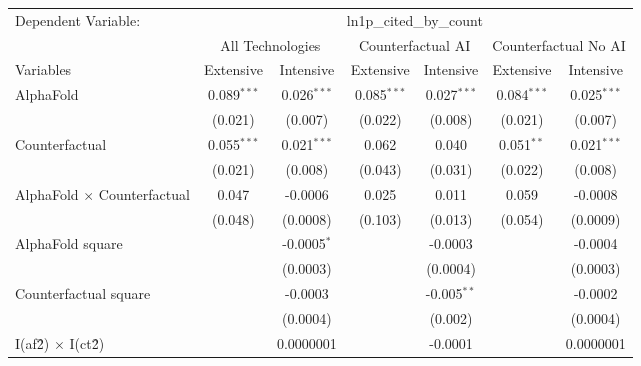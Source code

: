 \begingroup
\centering
\begin{tabular}{lcccccc}
   \tabularnewline \midrule \midrule
   Dependent Variable: & \multicolumn{6}{c}{ln1p\_cited\_by\_count}\\
 & \multicolumn{2}{c}{All Technologies} & \multicolumn{2}{c}{Counterfactual AI} & \multicolumn{2}{c}{Counterfactual No AI} \\
\cmidrule(lr){1-1}\cmidrule(lr){2-3} \cmidrule(lr){4-5} \cmidrule(lr){6-7}
Variables & \multicolumn{1}{c}{Extensive} & \multicolumn{1}{c}{Intensive} & \multicolumn{1}{c}{Extensive} & \multicolumn{1}{c}{Intensive} & \multicolumn{1}{c}{Extensive} & \multicolumn{1}{c}{Intensive} \\
\cmidrule(lr){1-1}\cmidrule(lr){2-2} \cmidrule(lr){3-3} \cmidrule(lr){4-4} \cmidrule(lr){5-5} \cmidrule(lr){6-6} \cmidrule(lr){7-7}
   AlphaFold                          & 0.089$^{***}$ & 0.026$^{***}$ & 0.085$^{***}$ & 0.027$^{***}$ & 0.084$^{***}$ & 0.025$^{***}$\\   
                                      & (0.021)       & (0.007)       & (0.022)       & (0.008)       & (0.021)       & (0.007)\\   
   Counterfactual                     & 0.055$^{***}$ & 0.021$^{***}$ & 0.062         & 0.040         & 0.051$^{**}$  & 0.021$^{***}$\\   
                                      & (0.021)       & (0.008)       & (0.043)       & (0.031)       & (0.022)       & (0.008)\\   
   AlphaFold $\times$ Counterfactual  & 0.047         & -0.0006       & 0.025         & 0.011         & 0.059         & -0.0008\\   
                                      & (0.048)       & (0.0008)      & (0.103)       & (0.013)       & (0.054)       & (0.0009)\\   
   AlphaFold square                   &               & -0.0005$^{*}$ &               & -0.0003       &               & -0.0004\\   
                                      &               & (0.0003)      &               & (0.0004)      &               & (0.0003)\\   
   Counterfactual square              &               & -0.0003       &               & -0.005$^{**}$ &               & -0.0002\\   
                                      &               & (0.0004)      &               & (0.002)       &               & (0.0004)\\   
   I(af\^2) $\times$ I(ct\^2)         &               & 0.0000001     &               & -0.0001       &               & 0.0000001\\   

\end{tabular}
